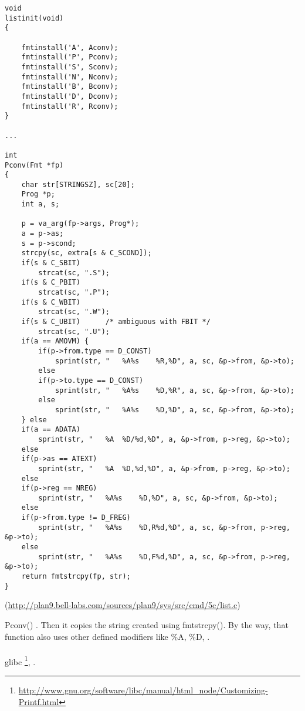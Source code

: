\begin{lstlisting}[caption=go\textbackslash{}src\textbackslash{}cmd\textbackslash{}5c\textbackslash{}list.c]
void
listinit(void)
{

	fmtinstall('A', Aconv);
	fmtinstall('P', Pconv);
	fmtinstall('S', Sconv);
	fmtinstall('N', Nconv);
	fmtinstall('B', Bconv);
	fmtinstall('D', Dconv);
	fmtinstall('R', Rconv);
}

...

int
Pconv(Fmt *fp)
{
	char str[STRINGSZ], sc[20];
	Prog *p;
	int a, s;

	p = va_arg(fp->args, Prog*);
	a = p->as;
	s = p->scond;
	strcpy(sc, extra[s & C_SCOND]);
	if(s & C_SBIT)
		strcat(sc, ".S");
	if(s & C_PBIT)
		strcat(sc, ".P");
	if(s & C_WBIT)
		strcat(sc, ".W");
	if(s & C_UBIT)		/* ambiguous with FBIT */
		strcat(sc, ".U");
	if(a == AMOVM) {
		if(p->from.type == D_CONST)
			sprint(str, "	%A%s	%R,%D", a, sc, &p->from, &p->to);
		else
		if(p->to.type == D_CONST)
			sprint(str, "	%A%s	%D,%R", a, sc, &p->from, &p->to);
		else
			sprint(str, "	%A%s	%D,%D", a, sc, &p->from, &p->to);
	} else
	if(a == ADATA)
		sprint(str, "	%A	%D/%d,%D", a, &p->from, p->reg, &p->to);
	else
	if(p->as == ATEXT)
		sprint(str, "	%A	%D,%d,%D", a, &p->from, p->reg, &p->to);
	else
	if(p->reg == NREG)
		sprint(str, "	%A%s	%D,%D", a, sc, &p->from, &p->to);
	else
	if(p->from.type != D_FREG)
		sprint(str, "	%A%s	%D,R%d,%D", a, sc, &p->from, p->reg, &p->to);
	else
		sprint(str, "	%A%s	%D,F%d,%D", a, sc, &p->from, p->reg, &p->to);
	return fmtstrcpy(fp, str);
}
\end{lstlisting}
(\url{http://plan9.bell-labs.com/sources/plan9/sys/src/cmd/5c/list.c})

 Pconv() 
.
{Then it copies the string created using} fmtstrcpy().
{By the way, that function also uses other defined modifiers like} \%A, \%D, . \\
\\
 \gls{glibc}
\footnote{\url{http://www.gnu.org/software/libc/manual/html_node/Customizing-Printf.html}}, 
 .

